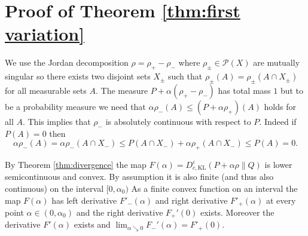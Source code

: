 \documentclass{amsart}
\theoremstyle{definition}
\theoremstyle{remark}
\numberwithin{equation}{section}
\begin{document}
\section{Proof of Theorem \ref{thm:first variation}}\label{sec:proofs:firstvariation}
We use the Jordan decomposition $\rho=\rho_+-\rho_-$ where $\rho_{\pm}\in \mathcal{P}(X)$ are mutually singular so there exists two disjoint sets $X_\pm$ such that $\rho_\pm(A)=\rho_\pm(A \cap X_\pm)$
for all measurable sets $A$. The measure $P+ \alpha(\rho_+-\rho_-)$ has total mass $1$ but to be a probability measure we need that
$\alpha \rho_-(A) \le (P+\alpha \rho_+)(A)$ holds for all $A$. This implies that $\rho_-$ is absolutely continuous with respect to $P$.  Indeed if $P(A)=0$ then 
\begin{equation}\label{eq:perturb:abs_contin}
\alpha \rho_-(A)=\alpha \rho_-(A \cap X_-) \le P(A\cap X_-) + \alpha \rho_+(A \cap X_-) \le P(A) =0.   
\end{equation}



By Theorem \ref{thm:divergence} the map 
$F(\alpha)= D_{c,\textrm{KL}}^\varepsilon(P + \alpha \rho\|Q)$ is lower semicontinuous and convex. By assumption it is also finite (and thus also continuous) on the interval $[0,\alpha_0)$  As a 
finite convex function on an interval the map $F(\alpha)$ has left derivative $F'_-(\alpha)$ and right derivative $F'_+(\alpha)$ at every point $\alpha \in (0,\alpha_0)$ and the right derivative $F_+'(0)$ exists. 
Moreover the derivative $F'(\alpha)$ exists  and $\lim_{\alpha \searrow 0} F_-'(\alpha)=F'_+(0)$. 
\end{document}
